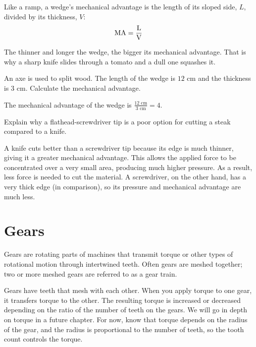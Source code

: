Like a ramp, a wedge's mechanical advantage is the length of its sloped side, $L$, divided by its thickness, $V$:
\begin{equation}
   \rm MA = \frac{L}{V}
\end{equation}

The thinner and longer the wedge, the bigger its mechanical advantage. That is why a sharp knife slides through a tomato and a dull one squashes it.

\begin{Exercise}[title = {Wedges 1}, label = {wedgesEX}]
An axe is used to split wood. The length of the wedge is $12 \textrm{ cm}$ and the thickness is $3 \textrm{ cm}$. Calculate the mechanical advantage.
\end{Exercise}
\begin{Answer}[ref={wedgesEX}]

The mechanical advantage of the wedge is $\tfrac{12 \textrm{ cm}}{3 \textrm{ cm}} = 4$.

\end{Answer}

\begin{Exercise}[title={Wedges 2}, label={wedgesSA}]
Explain why a flathead-screwdriver tip is a poor option for cutting a steak compared to a knife.
\end{Exercise}
\begin{Answer}[ref={wedgesSA}]
A knife cuts better than a screwdriver tip because its edge is much thinner, giving it a greater mechanical advantage. This allows the applied force to be concentrated over a very small area, producing much higher pressure. As a result, less force is needed to cut the material. A screwdriver, on the other hand, has a very thick edge (in comparison), so its pressure and mechanical advantage are much less.
\end{Answer}

\section{Gears}
Gears are rotating parts of machines that transmit torque or other types of rotational motion through intertwined teeth. Often gears are meshed together; two or more meshed gears are referred to as a gear train.

Gears have teeth that mesh with each other. When you apply torque to one gear, 
it transfers torque to the other. The resulting torque is increased or decreased 
depending on the ratio of the number of teeth on the gears. We will go in depth on torque in a future chapter. For now, know that torque depends on the radius of the gear, and the radius is proportional to the number of teeth, so the tooth count controls the torque.

